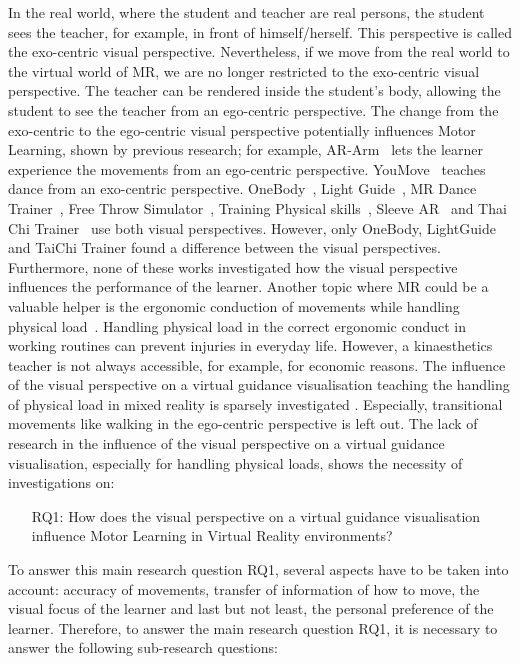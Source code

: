 In the real world, where the student and teacher are real persons, the student sees the teacher, for example, in front of himself/herself. This perspective is called the exo-centric visual perspective. Nevertheless, if we move from the real world to the virtual world of MR, we are no longer restricted to the exo-centric visual perspective. The teacher can be rendered inside the student's body, allowing the student to see the teacher from an ego-centric perspective. The change from the exo-centric to the ego-centric visual perspective potentially influences Motor Learning, shown by previous research; for example, AR-Arm~\cite{ararm} lets the learner experience the movements from an ego-centric perspective. YouMove~\cite{YouMove} teaches dance from an exo-centric perspective. OneBody~\cite{onebody}, Light Guide~\cite{lightguide}, MR Dance Trainer~\cite{mrdancetrainer}, Free Throw Simulator~\cite{freethrowsimulator}, Training Physical skills~\cite{trainingphysicalskills}, Sleeve AR~\cite{sleevear} and Thai Chi Trainer~\cite{thaichichua} use both visual perspectives. However, only OneBody, LightGuide and TaiChi Trainer found a difference between the visual perspectives. Furthermore, none of these works investigated how the visual perspective influences the performance of the learner. Another topic where MR could be a valuable helper is the ergonomic conduction of movements while handling physical load~\cite{nursecare,kitt}. Handling physical load in the correct ergonomic conduct in working routines can prevent injuries in everyday life. However, a kinaesthetics teacher is not always accessible, for example, for economic reasons. The influence of the visual perspective on a virtual guidance visualisation teaching the handling of physical load in mixed reality is sparsely investigated  . Especially, transitional movements like walking in the ego-centric perspective is left out. The lack of research in the influence of the visual perspective on a virtual guidance visualisation, especially for handling physical loads, shows the necessity of investigations on:
\begin{itemize}
	\item[RQ1:] How does the visual perspective on a virtual guidance visualisation influence Motor Learning in Virtual Reality environments?
\end{itemize}
To answer this main research question RQ1, several aspects have to be taken into account: accuracy of movements, transfer of information of how to move, the visual focus of the learner and last but not least, the personal preference of the learner. Therefore, to answer the main research question RQ1, it is necessary to answer the following sub-research questions:
